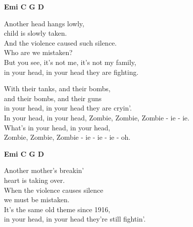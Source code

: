 
\re{}
\begin{footnotesize}
\textbf{Emi C G D}
\end{footnotesize}

\ve{}
Another head hangs lowly,\\
child is slowly taken.\\
And the violence caused such silence.\\
Who are we mistaken?\\
But you see, it's not me, it's not my family,\\
in your head, in your head they are fighting.

\cho{}
With their tanks, and their bombs,\\
and their bombs, and their guns\\
in your head, in your head they are cryin'.\\
In your head, in your head, Zombie, Zombie, Zombie - ie - ie.\\
What's in your head, in your head,\\
Zombie, Zombie, Zombie - ie - ie - ie - oh.

\re{}
\begin{footnotesize}
\textbf{Emi C G D}
\end{footnotesize}

\ve{}
Another mother's breakin'\\
heart is taking over.\\
When the violence causes silence\\
we must be mistaken.\\
It's the same old theme since 1916,\\
in your head, in your head they're still fightin'.

\cho{}

\esong